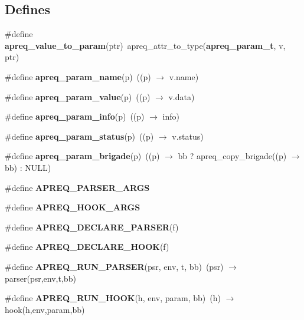 \subsection*{Defines}
\begin{CompactItemize}
\item 
\#define {\bf apreq\_\-value\_\-to\_\-param}(ptr)\ apreq\_\-attr\_\-to\_\-type({\bf apreq\_\-param\_\-t}, v, ptr)
\item 
{}
\#define {\bf apreq\_\-param\_\-name}(p)\ ((p) $\rightarrow$ v.name)\label{group__params_a23}

\item 
{}
\#define {\bf apreq\_\-param\_\-value}(p)\ ((p) $\rightarrow$ v.data)\label{group__params_a24}

\item 
{}
\#define {\bf apreq\_\-param\_\-info}(p)\ ((p) $\rightarrow$ info)\label{group__params_a25}

\item 
{}
\#define {\bf apreq\_\-param\_\-status}(p)\ ((p) $\rightarrow$ v.status)\label{group__params_a26}

\item 
{}
\#define {\bf apreq\_\-param\_\-brigade}(p)\ ((p) $\rightarrow$ bb ? apreq\_\-copy\_\-brigade((p) $\rightarrow$ bb) : NULL)\label{group__params_a27}

\item 
\#define {\bf APREQ\_\-PARSER\_\-ARGS}
\item 
\#define {\bf APREQ\_\-HOOK\_\-ARGS}
\item 
\#define {\bf APREQ\_\-DECLARE\_\-PARSER}(f)
\item 
\#define {\bf APREQ\_\-DECLARE\_\-HOOK}(f)
\item 
\#define {\bf APREQ\_\-RUN\_\-PARSER}(psr, env, t, bb)\ (psr) $\rightarrow$ parser(psr,env,t,bb)
\item 
\#define {\bf APREQ\_\-RUN\_\-HOOK}(h, env, param, bb)\ (h) $\rightarrow$ hook(h,env,param,bb)
\end{CompactItemize}
